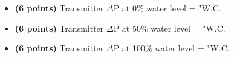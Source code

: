 \begin{itemize}
\item{} {\bf (6 points)} Transmitter $\Delta$P at 0\% water level =  "W.C.
\item{} {\bf (6 points)} Transmitter $\Delta$P at 50\% water level =  "W.C.
\item{} {\bf (6 points)} Transmitter $\Delta$P at 100\% water level =  "W.C.
\end{itemize}











